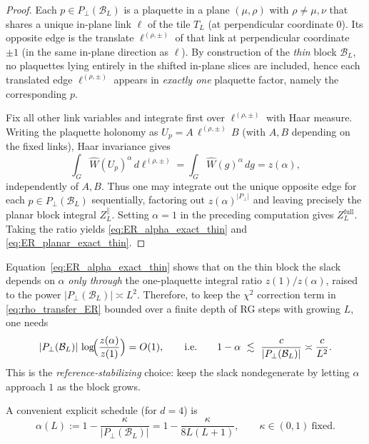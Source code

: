 \begin{proof}
Each $p\in P_\perp(\mathcal B_L)$ is a plaquette in a plane $(\mu,\rho)$ with $\rho\neq \mu,\nu$
that shares a unique in-plane link $\ell$ of the tile $T_L$ (at perpendicular coordinate $0$).
Its opposite edge is the translate $\ell^{(\rho,\pm)}$ of that link at perpendicular coordinate $\pm 1$
(in the same in-plane direction as $\ell$).
By construction of the \emph{thin} block $\mathcal B_L$, no plaquettes lying entirely in the shifted
in-plane slices are included, hence each translated edge $\ell^{(\rho,\pm)}$ appears in \emph{exactly one}
plaquette factor, namely the corresponding $p$.

Fix all other link variables and integrate first over $\ell^{(\rho,\pm)}$ with Haar measure.
Writing the plaquette holonomy as $U_p=A\,\ell^{(\rho,\pm)}\,B$ (with $A,B$ depending on the fixed links),
Haar invariance gives
\[
\int_G \widehat W(U_p)^{\alpha}\,d\ell^{(\rho,\pm)}
=
\int_G \widehat W(g)^{\alpha}\,dg
=z(\alpha),
\]
independently of $A,B$.
Thus one may integrate out the unique opposite edge for each $p\in P_\perp(\mathcal B_L)$ sequentially,
factoring out $z(\alpha)^{|P_\perp|}$ and leaving precisely the planar block integral $Z_L^{\parallel}$.
Setting $\alpha=1$ in the preceding computation gives $Z_L^{\mathrm{full}}$.
Taking the ratio yields \eqref{eq:ER_alpha_exact_thin} and \eqref{eq:ER_planar_exact_thin}.
\end{proof}

\begin{remark}\label{rem:alpha_scaling}
Equation~\eqref{eq:ER_alpha_exact_thin} shows that on the thin block the slack depends on $\alpha$
\emph{only through} the one-plaquette integral ratio $z(1)/z(\alpha)$, raised to the power $|P_\perp(\mathcal B_L)|\asymp L^2$.
Therefore, to keep the $\chi^2$ correction term in \eqref{eq:rho_transfer_ER} bounded over a finite depth of RG steps with growing $L$,
one needs
\[
|P_\perp(\mathcal B_L)|\,\log\!\Bigl(\frac{z(\alpha)}{z(1)}\Bigr)=O(1),
\qquad\text{i.e.}\qquad
1-\alpha \ \lesssim\ \frac{c}{|P_\perp(\mathcal B_L)|}\asymp \frac{c}{L^2}.
\]
This is the \emph{reference-stabilizing} choice: keep the slack nondegenerate by letting
$\alpha$ approach $1$ as the block grows.

A convenient explicit schedule (for $d=4$) is
\begin{equation}\label{eq:alpha_schedule_L}
\alpha(L):=1-\frac{\kappa}{|P_\perp(\mathcal B_L)|}
=1-\frac{\kappa}{8L(L+1)},
\qquad \kappa\in(0,1)\ \text{fixed}.
\end{equation}

\end{remark}

